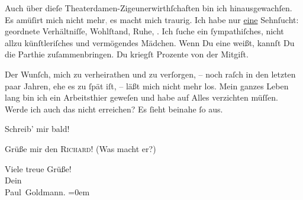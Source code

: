 \pstart
           Auch über dieſe Theaterdamen-Zigeunerwirthſchaften bin ich hinausgewachſen. Es
               amüſirt mich nicht mehr\textcolor{gray}{,} es macht mich \strikeout{\textcolor{gray}{trau}} traurig. {\pb}Ich habe nur \uline{eine} Sehnſucht: geordnete Verhältniſſe, Wohlſtand, Ruhe, \label{K_L02903-3v}\label{K_L02903-3}. Ich{ }ſuche ein{ }ſympathiſches, nicht allzu künſtleriſches und vermögendes Mädchen. Wenn Du eine
               weißt, kannſt Du die Parthie zuſammenbringen. Du kriegſt Prozente von der
               Mitgift.\pend
           
\pstart
           Der Wunſch, mich zu verheirathen und zu verſorgen, – noch raſch in den letzten paar
               Jahren, ehe es zu{ }ſpät iſt, – läßt mich nicht mehr los. Mein ganzes Leben lang bin
               ich ein Arbeitsthier geweſen und habe auf Alles verzichten müſſen. Werde ich auch das
               nicht erreichen? Es{ }ſieht {\pb}beinahe{ }ſo aus.\pend
           
\pstart
           Schreib’ mir bald!\pend
           
\pstart
           Grüße mir den \textsc{Richard}! (Was macht er?)\pend
           
\pstart
           Viele treue Grüße! {\\[\baselineskip]}Dein {\\[\baselineskip]}\spacefill\mbox{Paul Goldmann.}\pend
           \leftskip=0em{}\endnumbering{}  \newcommand{\dateiname}{L02903}\newcommand{\titel}{Paul Goldmann an Arthur Schnitzler, 23. 1. [1900]}\newcommand{\editorInnen}{Martin Anton Müller und Laura Untner}
